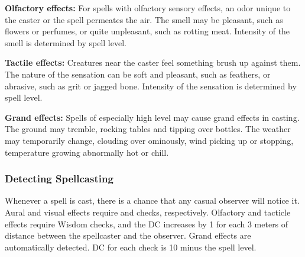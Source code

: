 \textbf{Olfactory effects:} For spells with olfactory sensory effects, an odor unique to the caster or the spell permeates the air. The smell may be pleasant, such as flowers or perfumes, or quite unpleasant, such as rotting meat. Intensity of the smell is determined by spell level.

\textbf{Tactile effects:} Creatures near the caster feel something brush up against them. The nature of the sensation can be soft and pleasant, such as feathers, or abrasive, such as grit or jagged bone. Intensity of the sensation is determined by spell level.

\textbf{Grand effects:} Spells of especially high level may cause grand effects in casting. The ground may tremble, rocking tables and tipping over bottles. The weather may temporarily change, clouding over ominously, wind picking up or stopping, temperature growing abnormally hot or chill.



\subsubsection{Detecting Spellcasting}
Whenever a spell is cast, there is a chance that any casual observer will notice it. Aural and visual effects require  and  checks, respectively. Olfactory and tacticle effects require Wisdom checks, and the DC increases by 1 for each 3 meters of distance between the spellcaster and the observer. Grand effects are automatically detected. DC for each check is 10 minus the spell level.

